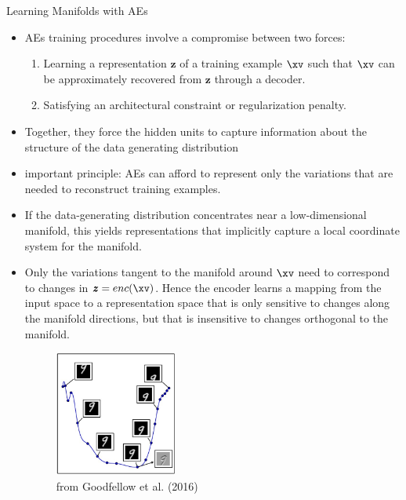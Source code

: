 \begin{vbframe}{Learning Manifolds with AEs}
  
    \begin{itemize}
        \item AEs training procedures involve a compromise between two forces:

            \begin{enumerate}
                \item Learning a representation $\pmb{z}$ of a training example $\xv$ such that $\xv$ can be approximately recovered from $\pmb{z}$ through a decoder.

                \item Satisfying an architectural constraint or regularization penalty.
            \end{enumerate}
   
       \item Together, they force the hidden units to capture information about the structure of the data generating distribution 
       
       \item important principle: AEs can afford to 
       represent only the variations that are needed to reconstruct training examples.
       
         \item If the data-generating distribution concentrates near a low-dimensional manifold, this yields representations that implicitly capture a local coordinate system for the manifold. 
         
         \framebreak
       
   \item Only the variations tangent to the manifold around $\xv$ need to correspond to changes in $\pmb{z}=enc(\xv)$. Hence the encoder learns a mapping from the input space to a representation space that is only sensitive to changes along the manifold directions, but that is insensitive to changes orthogonal to the manifold.  
       
       \begin{figure}
    \centering
    \includegraphics[width=4cm]{plots/AE-manifold.jpg}
    \caption{from Goodfellow et al. (2016) }
    \end{figure}
    

\end{itemize}
\end{vbframe}

